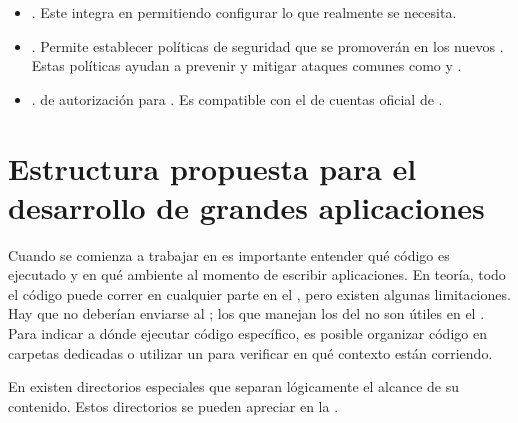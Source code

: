 \begin{itemize}
		\item
			\textbf{\bootstrapPackage}. Este \packageAS integra \bootstrapNAME en \meteorNAME permitiendo configurar lo que realmente se necesita.
		\item
			\textbf{\browserPolicyPackage}. Permite establecer políticas de seguridad que se promoverán en los nuevos \browsersINT. Estas políticas ayudan a prevenir y mitigar ataques comunes como \crossSiteScriptingINT y \clickjackingINT.
		\item
			\textbf{\alanningRolesPackage}. \packageAS de autorización para \meteorNAME. Es compatible con el \packageAS de cuentas oficial de \meteorNAME.

			
	\end{itemize}


\section{Estructura propuesta para el desarrollo de grandes aplicaciones}\label{cap:arquitectura:section:generic_architecture_structure}

Cuando se comienza a trabajar en \meteorNAME es importante entender qué código es ejecutado y en qué ambiente al momento de escribir aplicaciones. En teoría, todo el código puede correr en cualquier parte en el \stackAS, pero existen algunas limitaciones. Hay \apikeyAS que no deberían enviarse al \clientAS; los \events que manejan los \clicksPC del \mousePC no son útiles en el \serverAS. Para indicar a \meteorNAME dónde ejecutar código específico, es posible organizar código en carpetas dedicadas o utilizar un \checkCPT para verificar en qué contexto están corriendo.

En \meteorNAME existen directorios especiales que separan lógicamente el alcance de su contenido. Estos directorios se pueden apreciar en la .


